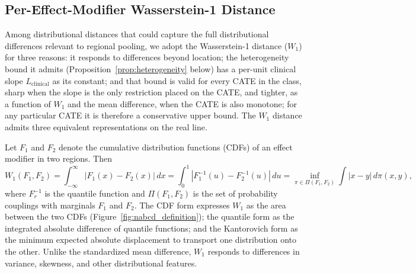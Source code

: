 \documentclass[AMA,Times1COL]{WileyNJDv5}
\begin{document}
\subsection{Per-Effect-Modifier Wasserstein-1 Distance}\label{sec:nabcd_metric}

Among distributional distances that could capture the full distributional differences relevant to regional pooling, we adopt the Wasserstein-1 distance ($W_1$) for three reasons: it responds to differences beyond location; the heterogeneity bound it admits (Proposition~\ref{prop:heterogeneity} below) has a per-unit clinical slope $L_{\text{clinical}}$ as its constant; and that bound is valid for every CATE in the class, sharp when the slope is the only restriction placed on the CATE, and tighter, as a function of $W_1$ and the mean difference, when the CATE is also monotone; for any particular CATE it is therefore a conservative upper bound. The $W_1$ distance admits three equivalent representations on the real line.\cite{villani2009,vallender1974}

Let $F_1$ and $F_2$ denote the cumulative distribution functions (CDFs) of an effect modifier in two regions. Then
\begin{equation}
W_1(F_1, F_2) = \int_{-\infty}^{\infty} |F_1(x) - F_2(x)| \, dx = \int_0^1 |F_1^{-1}(u) - F_2^{-1}(u)| \, du = \inf_{\pi \in \Pi(F_1, F_2)} \int |x - y| \, d\pi(x, y),
\label{eq:wasserstein}
\end{equation}
where $F_r^{-1}$ is the quantile function and $\Pi(F_1, F_2)$ is the set of probability couplings with marginals $F_1$ and $F_2$. The CDF form expresses $W_1$ as the area between the two CDFs (Figure~\ref{fig:nabcd_definition}); the quantile form as the integrated absolute difference of quantile functions; and the Kantorovich form as the minimum expected absolute displacement to transport one distribution onto the other.\cite{vallender1974} Unlike the standardized mean difference, $W_1$ responds to differences in variance, skewness, and other distributional features.\cite{panaretos2019}
\end{document}
